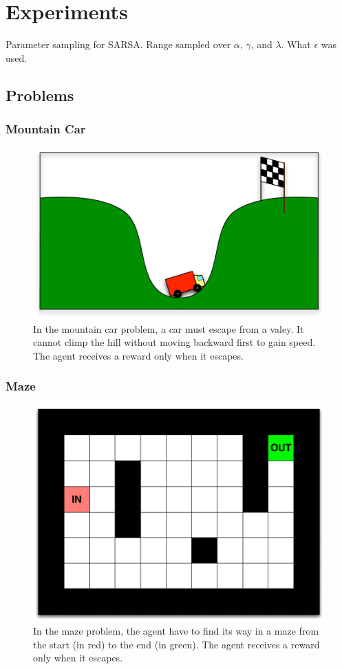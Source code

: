 \section{Experiments}

Parameter sampling for SARSA. Range sampled over $\alpha$, $\gamma$, and $\lambda$. What $\epsilon$ was used.

\subsection{Problems}
\subsubsection{Mountain Car}
\begin{figure}
\center
\includegraphics[width=0.75\linewidth]{MC_problem.pdf}
\caption{In the mountain car problem, a car must escape from a valey. It cannot climp the hill without moving backward first to gain speed. The agent receives a reward only when it escapes.}\label{fig:MC:problem}
\end{figure}

\subsubsection{Maze}
\begin{figure}
\center
\includegraphics[width=0.75\linewidth]{MZ_problem.pdf}
\caption{In the maze problem, the agent have to find its way in a maze from the start (in red) to the end (in green). The agent receives a reward only when it escapes.}\label{fig:MC:problem}
\end{figure}

